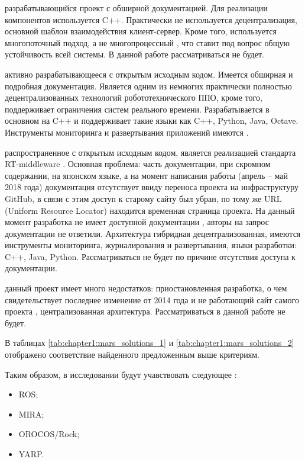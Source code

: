 \begin{description}[noitemsep]
	\item [SmartSoft] разрабатывающийся проект с обширной документацией. Для реализации компонентов используется C++. Практически не используется децентрализация, основной шаблон взаимодействия клиент-сервер. Кроме того, используется многопоточный подход, а не многопроцессный \cite{smartsoft-main-site}, что ставит под вопрос общую устойчивость всей системы. В данной работе рассматриваться не будет.
	
	\item [YARP] активно разрабатывающееся \marm{} с открытым исходным кодом. Имеется обширная и подробная документация. Является одним из немногих практически полностью децентрализованных технологий робототехнического ППО, кроме того, поддерживает ограничения систем реального времени. Разрабатывается в основном на C++ и поддерживает такие языки как C++, Python, Java, Octave. Инструменты мониторинга и развертывания приложений имеются \cite{yarp-main-site}.
	
	\item [OpenRTM-aist] распространенное \marm{} с открытым исходным кодом, является реализацией стандарта RT-middleware \cite{openrtmaist-old-site}. Основная проблема: часть документации, при скромном содержании, на японском языке, а на момент написания работы (апрель -- май 2018 года) документация отсутствует ввиду переноса проекта на инфраструктуру GitHub, в связи с этим доступ к старому сайту был убран, по тому же URL (Uniform Resource Locator) находится временная страница проекта. На данный момент разработка не имеет доступной документации \cite{openrtmaist-new-site}, авторы на запрос документации не ответили. Архитектура гибридная децентрализованная, имеются инструменты мониторинга, журналирования и развертывания, языки разработки: C++, Java, Python. Рассматриваться не будет по причине отсутствия доступа к документации.
	
	\item [URBI] данный проект имеет много недостатков: приостановленная разработка, о чем свидетельствует последнее изменение от 2014 года \cite{urbi-repo} и не работающий сайт самого проекта \cite{urbi-main-site}, централизованная архитектура. Рассматриваться в данной работе не будет. 
\end{description}

В таблицах \ref{tab:chapter1:mars_solutions_1} и \ref{tab:chapter1:mars_solutions_2} отображено соответствие найденного \marm{} предложенным выше критериям.

Таким образом, в исследовании будут учавствовать следующее \marm{}:
\begin{itemize}[noitemsep]
	\item ROS;
	\item MIRA;
	\item OROCOS/Rock;
	\item YARP.
\end{itemize}
